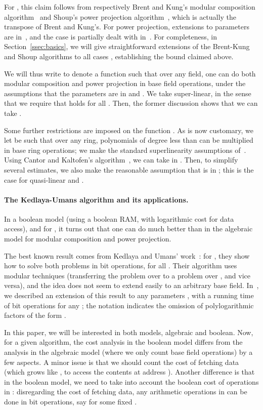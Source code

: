 \documentclass[12pt]{article}
\begin{document}
For , this claim follows from respectively Brent and
Kung's modular composition algorithm~\cite{BrKu78} and Shoup's power
projection algorithm~\cite{Shoup94}, which is actually the transpose
of Brent and Kung's. For power projection, extensions to parameters
 are in~\cite{Shoup99,Kaltofen00,BoFlSaSc06}, and the
case  is partially dealt with in~\cite{PaSc06}. For
completeness, in Section~\ref{ssec:basics}, we will give
straightforward extensions of the Brent-Kung and Shoup algorithms to
all cases , establishing the bound
 claimed above.

We will thus write  to denote a function such that over
any field, one can do both modular composition and power projection in
 base field operations, under the assumptions that
the parameters  are in  and .  We take  super-linear, in the sense that we require
that  holds for all
. Then, the former discussion shows that we can take .

Some further restrictions are imposed on the function . As is now
customary, we let  be such that over any ring,
polynomials of degree less than  can be multiplied in  base
ring operations; we make the standard superlinearity assumptions
of~\cite[Chapter~8]{GaGe03}. Using Cantor and Kaltofen's
algorithm~\cite{CaKa91}, we can take  in . Then, to simplify several estimates, we also make the
reasonable assumption that  is in ; this is
the case for  quasi-linear and .

\paragraph{The Kedlaya-Umans algorithm and its applications.}
In a boolean model (using a boolean RAM, with logarithmic cost for
data access), and for , it turns out that one can do much
better than in the algebraic model for modular composition and power
projection.

The best known result comes from Kedlaya and Umans'
work~\cite{KeUm10}: for , they show how to solve both problems in
 bit operations, for all
. Their algorithm uses modular techniques
(transferring the problem over  to a problem over , and vice
versa), and the idea does not seem to extend easily to an arbitrary
base field. In~\cite{PoSc10}, we described an extension of this result
to any parameters , with a running time of
 bit operations for any
; the  notation indicates the omission of
polylogarithmic factors of the form .

In this paper, we will be interested in both models, algebraic and
boolean. Now, for a given algorithm, the cost analysis in the boolean
model differs from the analysis in the algebraic model (where we only
count base field operations) by a few aspects. A minor issue is that
we should count the cost of fetching data (which grows like ,
to access the contents at address ). Another difference is that in
the boolean model, we need to take into account the boolean cost of
operations in : disregarding the cost of fetching data, any
arithmetic operations in  can be done in 
bit operations, say  for some fixed .
\end{document}
